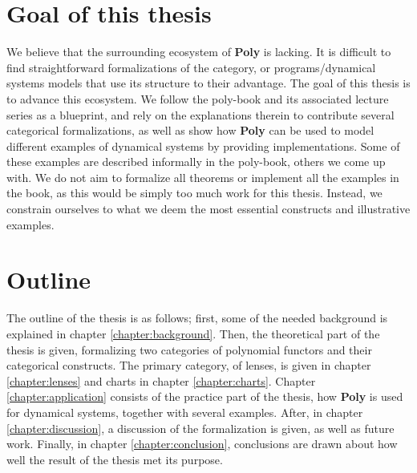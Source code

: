 \section{Goal of this thesis}
We believe that the surrounding ecosystem of \textbf{Poly} is lacking. It is difficult to find straightforward formalizations of the category, or programs/dynamical systems models that use its structure to their advantage. The goal of this thesis is to advance this ecosystem. We follow the poly-book and its associated lecture series as a blueprint, and rely on the explanations therein to contribute several categorical formalizations, as well as show how \textbf{Poly} can be used to model different examples of dynamical systems by providing implementations. Some of these examples are described informally in the poly-book, others we come up with. We do not aim to formalize all theorems or implement all the examples in the book, as this would be simply too much work for this thesis. Instead, we constrain ourselves to what we deem the most essential constructs and illustrative examples.





\section{Outline}
The outline of the thesis is as follows; first, some of the needed background is explained in chapter \ref{chapter:background}. Then, the theoretical part of the thesis is given, formalizing two categories of polynomial functors and their categorical constructs. The primary category, of lenses, is given in chapter \ref{chapter:lenses} and charts in chapter \ref{chapter:charts}. Chapter \ref{chapter:application} consists of the practice part of the thesis, how \textbf{Poly} is used for dynamical systems, together with several examples. After, in chapter \ref{chapter:discussion}, a discussion of the formalization is given, as well as future work. Finally, in chapter \ref{chapter:conclusion}, conclusions are drawn about how well the result of the thesis met its purpose.

